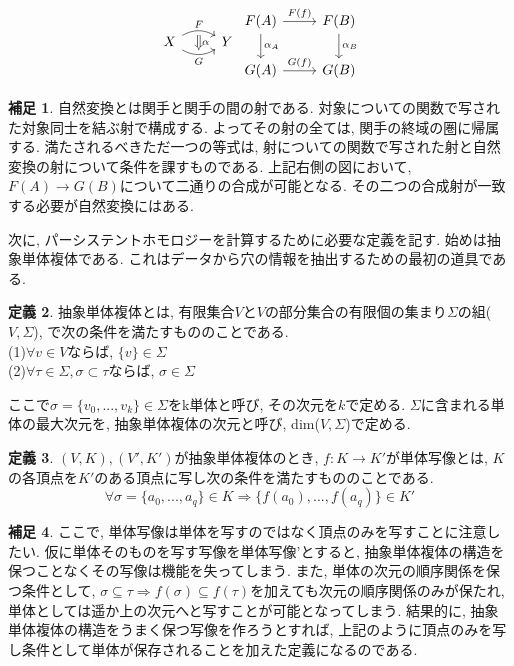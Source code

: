 \documentclass[a4paper]{jsarticle}
\theoremstyle{definition}
\newtheorem{dfn}{定義}[section]
\newtheorem{hsk}[dfn]{補足}
\begin{document}
\begin{equation}
\begin{tikzcd}
X
\arrow[r, bend left, "F"]
\arrow[r, bend right, swap, "G"]
\arrow[r, phantom, bend left, shift right=0.2ex, ""{name=U}]
\arrow[r, phantom, bend right, shift left=0.2ex, swap, ""{name=D}]
&Y
\arrow[Rightarrow, from=U, to=D, "\alpha"]
\end{tikzcd}
     \begin{tikzcd}
        F(A)\arrow{r}{F(f)} \arrow{d}{\alpha_A} & F(B)\arrow{d}{\alpha_B}\\
        G(A)\arrow{r}{G(f)} & G(B)
    \end{tikzcd}
\end{equation}
\begin{hsk}
    自然変換とは関手と関手の間の射である. 対象についての関数で写された対象同士を結ぶ射で構成する. よってその射の全ては, 関手の終域の圏に帰属する. 満たされるべきただ一つの等式は, 射についての関数で写された射と自然変換の射について条件を課すものである. 上記右側の図において, $F(A)\rightarrow G(B)$について二通りの合成が可能となる. その二つの合成射が一致する必要が自然変換にはある.\\
\end{hsk}
次に, パーシステントホモロジーを計算するために必要な定義を記す. 始めは抽象単体複体である. これはデータから穴の情報を抽出するための最初の道具である. 
\begin{dfn}
    抽象単体複体とは, 有限集合$V$と$V$の部分集合の有限個の集まり$\Sigma$の組($V,\Sigma$), で次の条件を満たすもののことである.\\
    \noindent
    (1)$\forall v\in V$ならば, $\{v\}\in\Sigma$ \\
    (2)$\forall \tau\in \Sigma, \sigma\subset \tau$ならば, $\sigma\in \Sigma$
\end{dfn}
ここで$\sigma=\{v_0,...,v_k\}\in\Sigma$をk単体と呼び, その次元を$k$で定める. $\Sigma$に含まれる単体の最大次元を, 抽象単体複体の次元と呼び, dim($V,\Sigma$)で定める.
\begin{dfn}
    $(V, K), (V', K')$が抽象単体複体のとき, $f:K\rightarrow K'$が単体写像とは, $K$の各頂点を$K'$のある頂点に写し次の条件を満たすもののことである. 
\begin{equation}
    \forall\sigma =\{a_0,...,a_q\}\in K\Rightarrow \{f(a_0),...,f(a_q)\}\in K'
\end{equation}
\end{dfn}
\begin{hsk}
    ここで, 単体写像は単体を写すのではなく頂点のみを写すことに注意したい. 仮に単体そのものを写す写像を単体写像'とすると, 抽象単体複体の構造を保つことなくその写像は機能を失ってしまう. また, 単体の次元の順序関係を保つ条件として, $\sigma\subseteq\tau \Rightarrow f(\sigma) \subseteq f(\tau)$を加えても次元の順序関係のみが保たれ, 単体としては遥か上の次元へと写すことが可能となってしまう. 結果的に, 抽象単体複体の構造をうまく保つ写像を作ろうとすれば, 上記のように頂点のみを写し条件として単体が保存されることを加えた定義になるのである.
\end{hsk}
\end{document}
